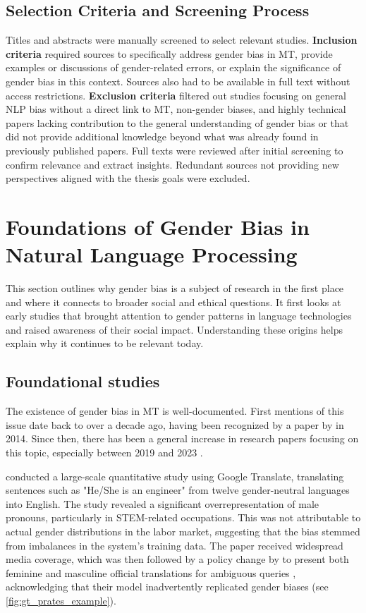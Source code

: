 \subsection{Selection Criteria and Screening Process}\label{subsection:selection_criteria}
Titles and abstracts were manually screened to select relevant studies. \textbf{Inclusion criteria} required sources to specifically address gender bias in MT, provide examples or discussions of gender-related errors, or explain the significance of gender bias in this context. Sources also had to be available in full text without access restrictions. \textbf{Exclusion criteria} filtered out studies focusing on general NLP bias without a direct link to MT, non-gender biases, and highly technical papers lacking contribution to the general understanding of gender bias or that did not provide additional knowledge beyond what was already found in previously published papers. Full texts were reviewed after initial screening to confirm relevance and extract insights. Redundant sources not providing new perspectives aligned with the thesis goals were excluded.

\section{Foundations of Gender Bias in Natural Language Processing}

This section outlines why gender bias is a subject of research in the first place and where it connects to broader social and ethical questions. It first looks at early studies that brought attention to gender patterns in language technologies and raised awareness of their social impact. Understanding these origins helps explain why it continues to be relevant today.

\subsection{Foundational studies}
The existence of gender bias in MT is well-documented. First mentions of this issue date back to over a decade ago, having been recognized by a paper by \citeauthor{schiebingerScientificResearchMust2014} in 2014. Since then, there has been a general increase in research papers focusing on this topic, especially between 2019 and 2023 \citep{savoldiDecadeGenderBias2025}.

\textbf{\citet{pratesAssessingGenderBias2019}} conducted a large-scale quantitative study using Google Translate, translating sentences such as "He/She is an engineer" from twelve gender-neutral languages into English. The study revealed a significant overrepresentation of male pronouns, particularly in STEM-related occupations. This was not attributable to actual gender distributions in the labor market, suggesting that the bias stemmed from imbalances in the system’s training data. The paper received widespread media coverage, which was then followed by a policy change by \citeauthor{googleReducingGenderBias2018} to present both feminine and masculine official translations for ambiguous queries \citep{googleReducingGenderBias2018}, acknowledging that their model inadvertently replicated gender biases (see \autoref{fig:gt_prates_example}). 

